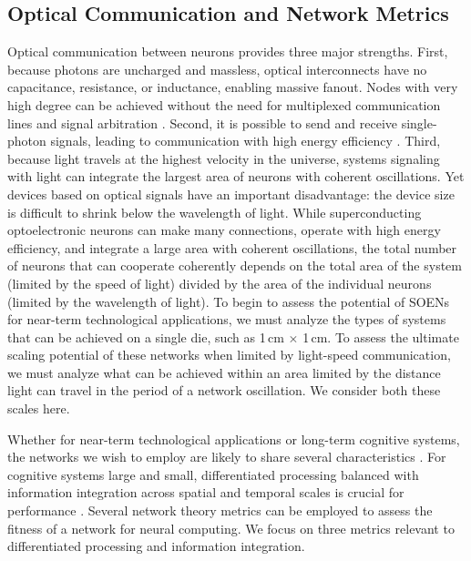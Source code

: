 \documentclass[twocolumn]{article}
\begin{document}
\subsection{\label{sec:opticalCommunicationAndGraphMetrics}Optical Communication and Network Metrics}
%
Optical communication between neurons provides three major strengths. First, because photons are uncharged and massless, optical interconnects have no capacitance, resistance, or inductance, enabling massive fanout. Nodes with very high degree can be achieved without the need for multiplexed communication lines and signal arbitration \cite{lide2015}. Second, it is possible to send and receive single-photon signals, leading to communication with high energy efficiency \cite{mave2013}. Third, because light travels at the highest velocity in the universe, systems signaling with light can integrate the largest area of neurons with coherent oscillations. Yet devices based on optical signals have an important disadvantage: the device size is difficult to shrink below the wavelength of light. While superconducting optoelectronic neurons can make many connections, operate with high energy efficiency, and integrate a large area with coherent oscillations, the total number of neurons that can cooperate coherently depends on the total area of the system (limited by the speed of light) divided by the area of the individual neurons (limited by the wavelength of light). To begin to assess the potential of SOENs for near-term technological applications, we must analyze the types of systems that can be achieved on a single die, such as 1\,cm $\times$ 1\,cm. To assess the ultimate scaling potential of these networks when limited by light-speed communication, we must analyze what can be achieved within an area limited by the distance light can travel in the period of a network oscillation. We consider both these scales here.

Whether for near-term technological applications or long-term cognitive systems, the networks we wish to employ are likely to share several characteristics \cite{busp2009}. For cognitive systems large and small, differentiated processing balanced with information integration across spatial and temporal scales is crucial for performance \cite{tosp2003,to2004,to2008,bu2006,sp2010,base2011,haah2017}. Several network theory metrics can be employed to assess the fitness of a network for neural computing. We focus on three metrics relevant to differentiated processing and information integration. 
\end{document}
